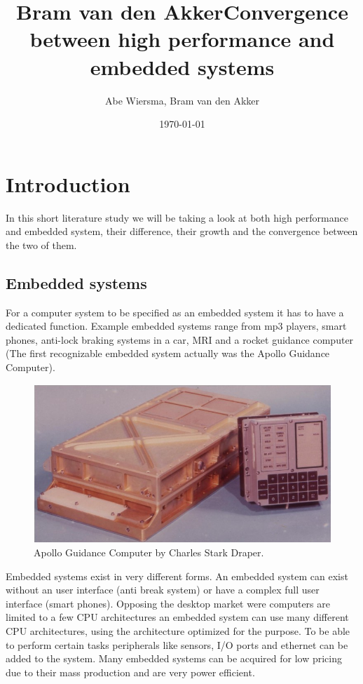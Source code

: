 \documentclass[10pt]{article}
\title{\bfseries\Huge Bram van den Akker}
\date{}
\begin{document}
\title{Convergence between high performance and embedded systems}
\author{Abe Wiersma, Bram van den Akker}
\date{\today}
\maketitle
\newpage

\section{Introduction}
In this short literature study we will be taking a look at both high performance and embedded system, their difference, their growth and the convergence between the two of them. 

\subsection{Embedded systems}
For a computer system to be specified as an embedded system it has to have a dedicated function. Example embedded systems range from mp3 players, smart phones, anti-lock braking systems in a car, MRI and a rocket guidance computer (The first recognizable embedded system actually was the Apollo Guidance Computer). 

\begin{figure}[h]
  \centering
    \includegraphics[width=\textwidth]{apollo.jpg}
  \caption {Apollo Guidance Computer by Charles Stark Draper.}
\end{figure}

Embedded systems exist in very different forms. An embedded system can exist without an user interface (anti break system) or have a complex full user interface (smart phones). Opposing the desktop market were computers are limited to a few CPU architectures an embedded system can use many different CPU architectures, using the architecture optimized for the purpose. To be able to perform certain tasks peripherals like sensors, I/O ports and ethernet can be added to the system. Many embedded systems can be acquired for low pricing due to their mass production and are very power efficient. 
\end{document}
